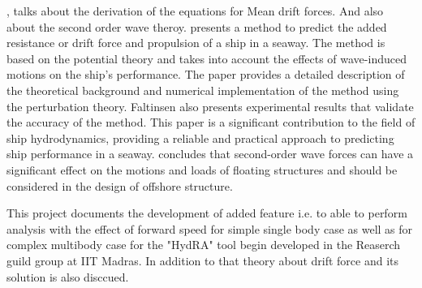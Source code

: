 \cite{faltinsen1980prediction},  \cite{pinkster1980low} talks about the derivation of the equations 
for Mean drift forces. And also about the second order wave theroy. 
\cite{faltinsen1980prediction} presents a method to predict the added resistance or drift force 
and propulsion of a ship in a seaway. 
The method is based on the potential theory and takes into account the 
effects of wave-induced motions on the ship's performance. The paper provides a detailed 
description of the theoretical background and numerical implementation of the method using
the perturbation theory. 
Faltinsen also presents experimental results that validate the accuracy of the method. 
This paper is a significant contribution to the field of ship hydrodynamics, providing a 
reliable and practical approach to predicting ship performance in a seaway.
\cite{pinkster1980low} concludes that second-order wave forces can have a significant
effect on the motions and loads of floating structures and should be considered in the 
design of offshore structure.

This project documents the development of added feature i.e. to able to perform analysis 
with the effect of forward speed for simple single body case as well as for complex multibody
case for the "HydRA" tool begin developed in the Reaserch guild group at IIT Madras. In addition to 
that theory about drift force and its solution is also disccued. 
